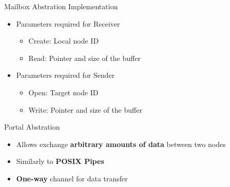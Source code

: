 		\begin{frame}[fragile]{Mailbox Abstration Implementation}
			\begin{itemize}
				\item Parameters required for Receiver
				\begin{itemize}
					\item Create: Local node ID
					\item Read: Pointer and size of the buffer
				\end{itemize}
				\item Parameters required for Sender
				\begin{itemize}
					\item Open: Target node ID
					\item Write: Pointer and size of the buffer
				\end{itemize}
			\end{itemize}

		\end{frame}

		\begin{frame}[fragile]{Portal Abstration}
			\begin{itemize}
				\item Allows exchange \textbf{arbitrary amounts of data} between two nodes
				\item Similarly to \textbf{POSIX Pipes}
				\item \textbf{One-way} channel for data transfer
			\end{itemize}


		\end{frame}

